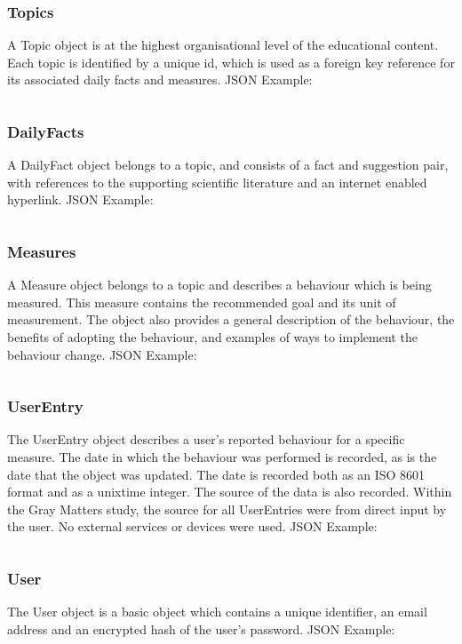 \subsubsection{Topics}
A Topic object is at the highest organisational level of the educational content. Each topic is identified by a unique id, which is used as a foreign key reference for its associated daily facts and measures. JSON Example: \inputminted{json}{Files/prevention-study-1/code/topicexample.json}

\subsubsection{DailyFacts}
A DailyFact object belongs to a topic, and consists of a fact and suggestion pair, with references to the supporting scientific literature and an internet enabled hyperlink. JSON Example: \inputminted{json}{Files/prevention-study-1/code/dailyfact.json}

\subsubsection{Measures}
A Measure object belongs to a topic and describes a behaviour which is being measured. This measure contains the recommended goal and its unit of measurement. The object also provides a general description of the behaviour, the benefits of adopting the behaviour, and examples of ways to implement the behaviour change. JSON Example: \inputminted{json}{Files/prevention-study-1/code/measures.json}

\subsubsection{UserEntry}
The UserEntry object describes a user's reported behaviour for a specific measure. The date in which the behaviour was performed is recorded, as is the date that the object was updated. The date is recorded both as an ISO 8601 format and as a unixtime integer. The source of the data is also recorded. Within the Gray Matters study, the source for all UserEntries were from direct input by the user. No external services or devices were used. JSON Example: \inputminted{json}{Files/prevention-study-1/code/userentry.json}

\subsubsection{User}
The User object is a basic object which contains a unique identifier, an email address and an encrypted hash of the user's password. JSON Example:
\inputminted{json}{Files/prevention-study-1/code/user.json}

